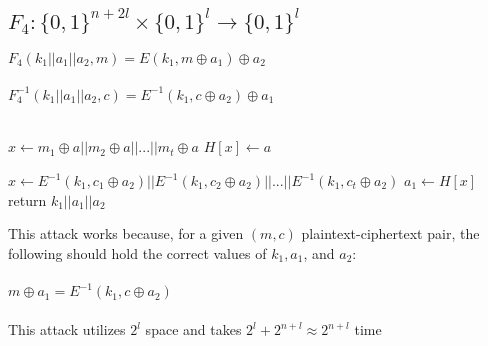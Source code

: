 \documentclass[]{article}
\begin{document}
\subsection{$F_4: \{0,1\}^{n + 2l}\times \{0,1\}^l \rightarrow \{0,1\}^l$}

$F_4(k_1 || a_1 || a_2, m) =  E(k_1, m \oplus a_1) \oplus a_2$
\\\\
$F_4^{-1}(k_1 || a_1 || a_2, c) =  E^{-1}(k_1, c \oplus a_2) \oplus a_1$
\\\\
\begin{algorithm}[H]
	\SetAlgoLined
	 {
		$x \leftarrow m_1 \oplus a ||m_2 \oplus a  || ... || m_t \oplus a $\;
		$H[x] \leftarrow a$\;
	}
	
	 {
		$x \leftarrow E^{-1}(k_1, c_1 \oplus a_2) || E^{-1}(k_1, c_2 \oplus a_2) || ... || E^{-1}(k_1, c_t \oplus a_2)$\;
		 {
			$a_1 \leftarrow H[x]$\;
			return $k_1 || a_1 || a_2$\;
		}
	}
	\caption{$Attack((m_1,c_1),(m_2, c_2), ..., (m_t, c_t))$}
\end{algorithm}
This attack works because, for a given $(m, c)$ plaintext-ciphertext pair, the following should hold the correct values of $k_1, a_1$, and $a_2$:
\\\\
$m \oplus a_1 = E^{-1}(k_1, c \oplus a_2)$
\\\\
This attack utilizes $2^l$ space and takes $2^l + 2^{n+l} \approx 2^{n + l}$ time
\end{document}
